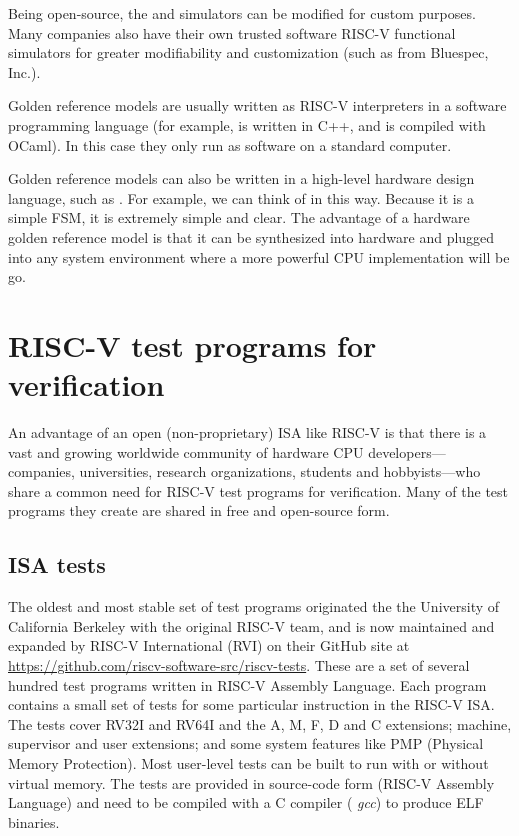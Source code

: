 Being open-source, the {\SPIKE} and {\SAIL} simulators can be modified
for custom purposes.  Many companies also have their own trusted
software RISC-V functional simulators for greater modifiability and
customization (such as {\CISSR} from Bluespec, Inc.).

Golden reference models are usually written as RISC-V interpreters in
a software programming language (for example, {\SPIKE} is written in
C++, and {\SAIL} is compiled with OCaml).  In this case they only run
as software on a standard computer.

Golden reference models can also be written in a high-level hardware
design language, such as {\BSV}.  For example, we can think of {\DRUM} in
this way.  Because it is a simple FSM, it is extremely simple and
clear.  The advantage of a hardware golden reference model is that it
can be synthesized into hardware and plugged into any system
environment where a more powerful CPU implementation will be go.


\section{RISC-V test programs for verification}

\label{Sec_test_suites}

An advantage of an open (non-proprietary) ISA like RISC-V is that
there is a vast and growing worldwide community of hardware CPU
developers---companies, universities, research organizations, students
and hobbyists---who share a common need for RISC-V test programs for
verification.  Many of the test programs they create are shared in
free and open-source form.


\subsection{ISA tests}

The oldest and most stable set of test programs originated the the
University of California Berkeley with the original RISC-V team, and
is now maintained and expanded by RISC-V International (RVI) on their
GitHub site at
\url{https://github.com/riscv-software-src/riscv-tests}.  These are a
set of several hundred test programs written in RISC-V Assembly
Language.  Each program contains a small set of tests for some
particular instruction in the RISC-V ISA.  The tests cover RV32I and
RV64I and the A, M, F, D and C extensions; machine, supervisor and
user extensions; and some system features like PMP (Physical Memory
Protection).  Most user-level tests can be built to run with or
without virtual memory.  The tests are provided in source-code form
(RISC-V Assembly Language) and need to be compiled with a C compiler
({\eg} \emph{gcc}) to produce ELF binaries.

